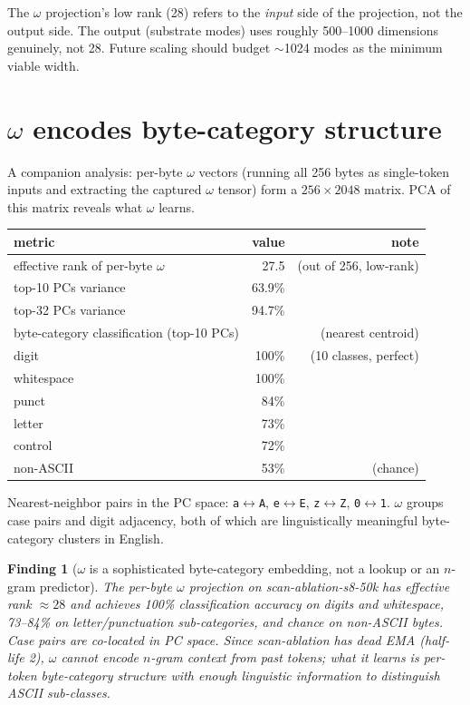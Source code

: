 \documentclass[11pt,openany]{book}
\newtheorem{finding}{Finding}[chapter]
\begin{document}
The $\omega$ projection's low rank (28) refers to the \emph{input} side of
the projection, not the output side. The output (substrate modes) uses
roughly 500--1000 dimensions genuinely, not 28. Future scaling should
budget $\sim$1024 modes as the minimum viable width.

\section{$\omega$ encodes byte-category structure}

A companion analysis: per-byte $\omega$ vectors (running all 256 bytes as
single-token inputs and extracting the captured $\omega$ tensor) form a
$256 \times 2048$ matrix. PCA of this matrix reveals what $\omega$ learns.

\begin{longtable}{lrr}
\toprule
metric & value & note \\
\midrule
effective rank of per-byte $\omega$ & 27.5 & (out of 256, low-rank) \\
top-10 PCs variance & 63.9\% & \\
top-32 PCs variance & 94.7\% & \\
\midrule
byte-category classification (top-10 PCs) & & (nearest centroid) \\
\quad digit & 100\% & (10 classes, perfect) \\
\quad whitespace & 100\% & \\
\quad punct & 84\% & \\
\quad letter & 73\% & \\
\quad control & 72\% & \\
\quad non-ASCII & 53\% & (chance) \\
\bottomrule
\end{longtable}

Nearest-neighbor pairs in the PC space:
\texttt{a}$\leftrightarrow$\texttt{A}, \texttt{e}$\leftrightarrow$\texttt{E},
\texttt{z}$\leftrightarrow$\texttt{Z}, \texttt{0}$\leftrightarrow$\texttt{1}.
$\omega$ groups case pairs and digit adjacency, both of which are
linguistically meaningful byte-category clusters in English.

\begin{finding}[$\omega$ is a sophisticated byte-category embedding, not a
lookup or an $n$-gram predictor]
The per-byte $\omega$ projection on scan-ablation-s8-50k has effective rank
$\approx 28$ and achieves 100\% classification accuracy on digits and
whitespace, 73--84\% on letter/punctuation sub-categories, and chance on
non-ASCII bytes. Case pairs are co-located in PC space. Since scan-ablation
has dead EMA (half-life 2), $\omega$ cannot encode $n$-gram context from
past tokens; what it learns is \emph{per-token} byte-category structure
with enough linguistic information to distinguish ASCII sub-classes.
\end{finding}
\end{document}
